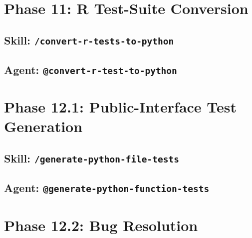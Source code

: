 \documentclass[12pt]{article}
\begin{document}


\section{Phase 11: R Test-Suite Conversion}
\label{app:phase11}

\subsection{Skill: \texttt{/convert-r-tests-to-python}}
\label{app:skill:convert-r-tests-to-python}



\subsection{Agent: \texttt{@convert-r-test-to-python}}
\label{app:agent:convert-r-test-to-python}



\section{Phase 12.1: Public-Interface Test Generation}
\label{app:phase12.1}

\subsection{Skill: \texttt{/generate-python-file-tests}}
\label{app:skill:generate-python-file-tests}



\subsection{Agent: \texttt{@generate-python-function-tests}}
\label{app:agent:generate-python-function-tests}



\section{Phase 12.2: Bug Resolution}
\label{app:phase12.2}
\end{document}
